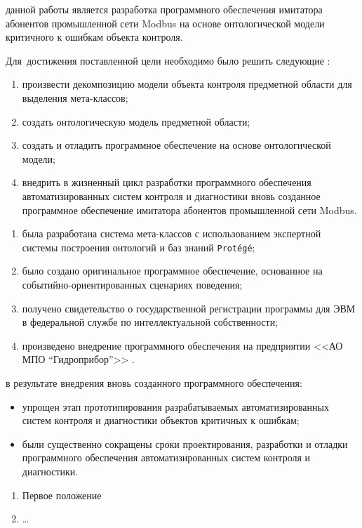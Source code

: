 {\aim} данной работы является разработка программного обеспечения 
  имитатора абонентов промышленной сети Modbus на основе онтологической модели критичного к ошибкам объекта контроля.

Для~достижения поставленной цели необходимо было решить следующие {\tasks}:
\begin{enumerate}
  \item произвести декомпозицию модели объекта контроля предметной области для выделения мета-классов;
  \item создать онтологическую модель предметной области;
  \item создать и отладить программное обеспечение на основе онтологической модели;
  \item внедрить в жизненный цикл разработки программного обеспечения автоматизированных систем контроля и диагностики
        вновь созданное программное обеспечение имитатора абонентов промышленной сети Modbus.
\end{enumerate}


{\novelty}
\begin{enumerate}
  \item была разработана система мета-классов с использованием экспертной системы построения онтологий и баз знаний \texttt{Protégé};
  \item было создано оригинальное программное обеспечение, основанное на событийно-ориентированных сценариях поведения;
  \item получено свидетельство о государственной регистрации программы для ЭВМ в федеральной службе по интеллектуальной собственности;
  \item произведено внедрение программного обеспечения на предприятии <<АО МПО ``Гидроприбор''>> .
\end{enumerate}

{\influence} в результате внедрения вновь созданного программного обеспечения:
\begin{itemize}
  \item упрощен этап прототипирования разрабатываемых автоматизированных систем контроля и диагностики объектов критичных к ошибкам;
  \item были существенно сокращены сроки проектирования, разработки и отладки программного обеспечения автоматизированных систем контроля и диагностики.
\end{itemize}

\todo{{\methods} \ldots}

\begin{enumerate}
  \item Первое положение
  \item \ldots
\end{enumerate}

